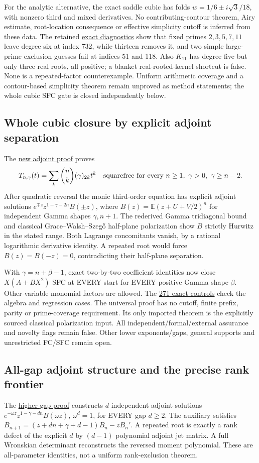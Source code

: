 \documentclass[11pt]{article}
\begin{document}
For the analytic alternative, the exact saddle cubic has folds
$w=1/6\pm i\sqrt3/18$, with nonzero third and mixed derivatives.
No contributing-contour theorem, Airy estimate, root-location consequence
or effective simplicity cutoff is inferred from these data.
The retained \href{tilted_cubic_frontier_diagnostics.json}{exact diagnostics}
show that fixed primes $2,3,5,7,11$ leave degree six at index 732,
while thirteen removes it, and two simple large-prime exclusion guesses
fail at indices 51 and 118. Also $K_{11}$ has degree five but only three
real roots, all positive; a blanket real-rooted-kernel shortcut is false.
None is a repeated-factor counterexample. Uniform arithmetic coverage and
a contour-based simplicity theorem remain unproved as method statements;
the whole cubic SFC gate is closed independently below.

\subsection*{Whole cubic closure by explicit adjoint separation}
The \href{CUBIC_ADJOINT_STABILITY_SFC.tex}{new adjoint proof} proves
\[
 T_{n,\gamma}(t)=\sum_k\binom nk(\gamma)_{2k}t^k
 \quad\hbox{squarefree for every }n\ge1,\ \gamma>0,\ \gamma\ge n-2.
\]
After quadratic reversal the monic third-order equation has explicit
adjoint solutions $e^{\mp z}z^{1-\gamma-2n}B(\pm z)$, where
$B(z)=\mathbb E(z+U+V/2)^n$ for independent Gamma shapes
$\gamma,n+1$. The rederived Gamma tridiagonal bound and classical
Grace--Walsh--Szeg\H{o} half-plane polarization show $B$ strictly Hurwitz
in the stated range. Both Lagrange concomitants vanish, by a rational
logarithmic derivative identity. A repeated root would force
$B(z)=B(-z)=0$, contradicting their half-plane separation.

With $\gamma=n+\beta-1$, exact two-by-two coefficient identities now
close $X(A+BX^2)$ SFC at EVERY start for EVERY positive Gamma shape
$\beta$. Other-variable monomial factors are allowed. The
\href{cubic_adjoint_stability_verification.json}{271 exact controls}
check the algebra and regression cases. The universal proof has no
cutoff, finite prefix, parity or prime-coverage requirement. Its only
imported theorem is the explicitly sourced classical polarization input.
All independent/formal/external assurance and novelty flags remain false.
Other lower exponents/gaps, general supports and unrestricted FC/SFC
remain open.

\subsection*{All-gap adjoint structure and the precise rank frontier}
The \href{HIGHER_GAP_ADJOINT_RANK.tex}{higher-gap proof} constructs
$d$ independent adjoint solutions $e^{-\omega z}z^{1-\gamma-dn}B(\omega z)$,
$\omega^d=1$, for EVERY gap $d\ge2$. The auxiliary satisfies
$B_{n+1}=(z+dn+\gamma+d-1)B_n-zB_n'$.
A repeated root is exactly a rank defect of the explicit $d$ by $(d-1)$
polynomial adjoint jet matrix. A full Wronskian determinant reconstructs
the reversed moment polynomial. These are all-parameter identities,
not a uniform rank-exclusion theorem.
\end{document}
